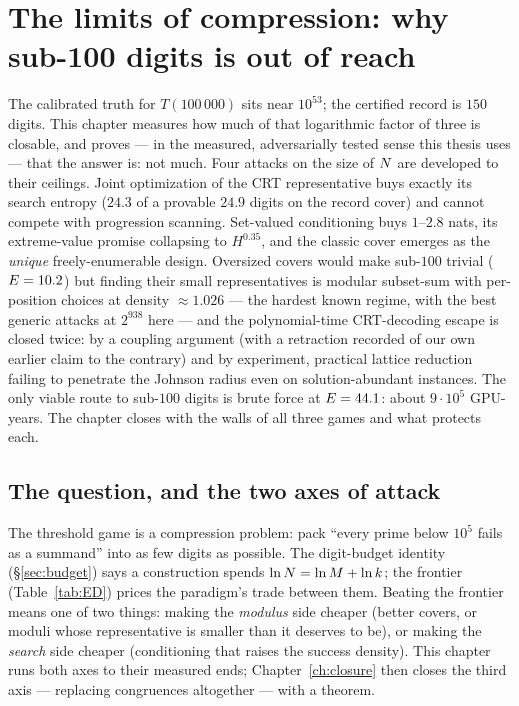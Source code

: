 \chapter{The limits of compression: why sub-100 digits is out of reach}
\label{ch:limits}

\begin{chapterabstract}
The calibrated truth for $T(100\,000)$ sits near $10^{53}$; the
certified record is $150$ digits. This chapter measures how much of
that logarithmic factor of three is closable, and proves --- in the
measured, adversarially tested sense this thesis uses --- that the
answer is: not much. Four attacks on the size of $N$ are developed to
their ceilings. Joint optimization of the CRT representative buys
exactly its search entropy ($24.3$ of a provable $24.9$ digits on the
record cover) and cannot compete with progression scanning.
Set-valued conditioning buys $1$--$2.8$ nats, its
extreme-value promise collapsing to $H^{0.35}$, and the classic cover
emerges as the \emph{unique} freely-enumerable design. Oversized covers
would make sub-$100$ trivial ($E=10.2$) but finding their small
representatives is modular subset-sum with per-position choices at
density $\approx1.026$ --- the hardest known regime, with the best
generic attacks at $2^{938}$ here --- and the polynomial-time
CRT-decoding escape is closed twice: by a coupling argument (with a
retraction recorded of our own earlier claim to the contrary) and by
experiment, practical lattice reduction failing to penetrate the
Johnson radius even on solution-abundant instances. The only viable
route to sub-$100$ digits is brute force at
$E=44.1$: about $9\cdot10^5$ GPU-years. The chapter closes with the
walls of all three games and what protects each.
\end{chapterabstract}

\section{The question, and the two axes of attack}\label{sec:question}

The threshold game is a compression problem: pack ``every prime below
$10^5$ fails as a summand'' into as few digits as possible. The
digit-budget identity (\S\ref{sec:budget}) says a construction spends
$\ln N=\ln M+\ln k$; the frontier (Table~\ref{tab:ED}) prices the
paradigm's trade between them. Beating the frontier means one of two
things: making the \emph{modulus} side cheaper (better covers, or
moduli whose representative is smaller than it deserves to be), or
making the \emph{search} side cheaper (conditioning that raises the
success density). This chapter runs both axes to their measured ends;
Chapter~\ref{ch:closure} then closes the third axis --- replacing
congruences altogether --- with a theorem.

